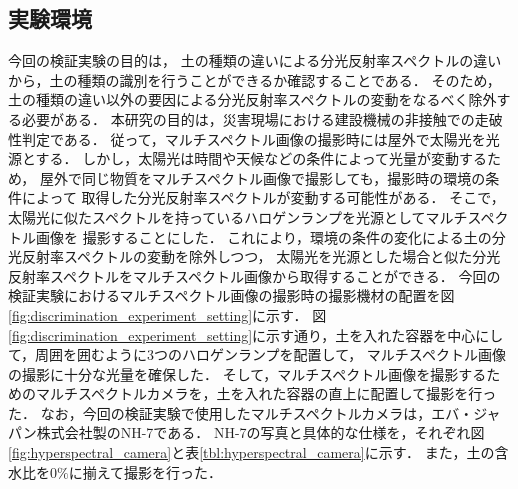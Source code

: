 \subsection{実験環境}
\label{ssec:DiscriminationExperimentSetting}

今回の検証実験の目的は，
土の種類の違いによる分光反射率スペクトルの違いから，土の種類の識別を行うことができるか確認することである．
そのため，土の種類の違い以外の要因による分光反射率スペクトルの変動をなるべく除外する必要がある．
本研究の目的は，災害現場における建設機械の非接触での走破性判定である．
従って，マルチスペクトル画像の撮影時には屋外で太陽光を光源とする．
しかし，太陽光は時間や天候などの条件によって光量が変動するため，
屋外で同じ物質をマルチスペクトル画像で撮影しても，撮影時の環境の条件によって
取得した分光反射率スペクトルが変動する可能性がある．
そこで，太陽光に似たスペクトルを持っているハロゲンランプを光源としてマルチスペクトル画像を
撮影することにした．
これにより，環境の条件の変化による土の分光反射率スペクトルの変動を除外しつつ，
太陽光を光源とした場合と似た分光反射率スペクトルをマルチスペクトル画像から取得することができる．
今回の検証実験におけるマルチスペクトル画像の撮影時の撮影機材の配置を図\ref{fig:discrimination_experiment_setting}に示す．%
図\ref{fig:discrimination_experiment_setting}に示す通り，土を入れた容器を中心にして，周囲を囲むように3つのハロゲンランプを配置して，
マルチスペクトル画像の撮影に十分な光量を確保した．
そして，マルチスペクトル画像を撮影するためのマルチスペクトルカメラを，土を入れた容器の直上に配置して撮影を行った．
なお，今回の検証実験で使用したマルチスペクトルカメラは，エバ・ジャパン株式会社製のNH-7である．
NH-7の写真と具体的な仕様を，それぞれ図\ref{fig:hyperspectral_camera}と表\ref{tbl:hyperspectral_camera}に示す．
また，土の含水比を0$\%$に揃えて撮影を行った．

